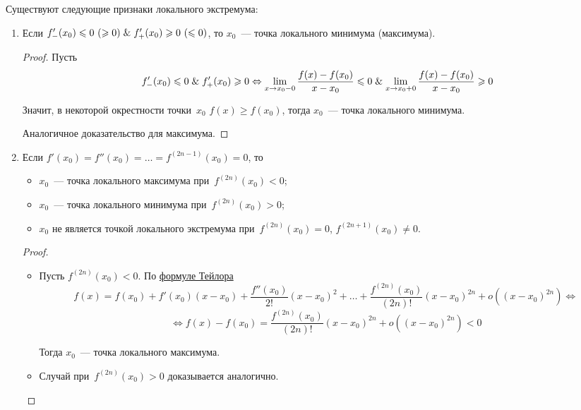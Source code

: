 Существуют следующие признаки локального экстремума:
\begin{enumerate}
	\item Если $f_-'(x_0) \leqslant 0 \ (\geqslant 0) \lAnd f_+'(x_0) \geqslant 0 \ (\leqslant 0)$, то $x_0$~--- точка локального минимума (максимума).
	\begin{proof}
	Пусть
	\begin{equation*}
	f_-'(x_0) \leqslant 0 \mathrel{\&} f_+'(x_0) \geqslant 0 \Leftrightarrow
	\lim_{x \to x_0-0} \frac{f(x) - f(x_0)}{x - x_0} \leqslant 0 \mathrel{\&}
	\lim_{x \to x_0+0} \frac{f(x) - f(x_0)}{x - x_0} \geqslant 0
	\end{equation*}
	
	Значит, в некоторой окрестности точки~$x_0$ $f(x) \geqslant f(x_0)$, тогда $x_0$~--- точка локального минимума.
	
	Аналогичное доказательство для максимума.
	\end{proof}
	
	\item Если $f'(x_0) = f''(x_0) = \ldots = f^{(2n-1)}(x_0) = 0$, то
	\begin{itemize}
		\item $x_0$~--- точка локального максимума при~$f^{(2n)}(x_0) < 0$;
		\item $x_0$~--- точка локального минимума при~$f^{(2n)}(x_0) > 0$;
		\item $x_0$ не является точкой локального экстремума при~$f^{(2n)}(x_0) = 0$, $f^{(2n+1)}(x_0) \neq 0$.
	\end{itemize}
	\begin{proof}
	\begin{itemize}
		\item Пусть $f^{(2n)}(x_0) < 0$.
		По \hyperref[eq:Taylor_series]{формуле Тейлора}
		\begin{equation*}
		f(x) = f(x_0) + f'(x_0)(x - x_0) + \frac{f''(x_0)}{2!} (x - x_0)^2 + \ldots + \frac{f^{(2n)}(x_0)}{(2n)!} (x - x_0)^{2n} + o((x - x_0)^{2n}) \Leftrightarrow
		\end{equation*}
		\begin{equation*}
		\Leftrightarrow f(x) - f(x_0) = \frac{f^{(2n)}(x_0)}{(2n)!} (x - x_0)^{2n} + o((x - x_0)^{2n}) < 0
		\end{equation*}
		
		Тогда $x_0$~--- точка локального максимума.
		
		\item Случай при~$f^{(2n)}(x_0) > 0$ доказывается аналогично.
		

\end{itemize}
\end{proof}
\end{enumerate}
